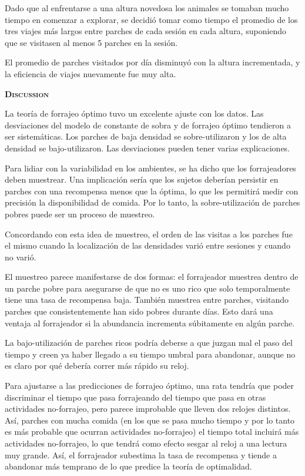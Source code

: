\documentclass[a4paper,12pt]{article}
\begin{document}
Dado que al enfrentarse a una altura novedosa los animales se tomaban mucho tiempo en comenzar a explorar, se decidió tomar como tiempo el promedio de los tres viajes más largos entre parches de cada sesión en cada altura, suponiendo que se visitasen al menos 5 parches en la sesión.

El promedio de parches visitados por día disminuyó con la altura incrementada, y la eficiencia de viajes nuevamente fue muy alta.

{\scshape\bfseries Discussion}

La teoría de forrajeo óptimo tuvo un excelente ajuste con los datos. Las desviaciones del modelo de constante de sobra y de forrajeo óptimo tendieron a ser sistemáticas. Los parches de baja densidad se sobre-utilizaron y los de alta densidad se bajo-utilizaron. Las desviaciones pueden tener varias explicaciones.

Para lidiar con la variabilidad en los ambientes, se ha dicho que los forrajeadores deben muestrear. Una implicación sería que los sujetos deberían persistir en parches con una recompensa menos que la óptima, lo que les permitirá medir con precisión la disponibilidad de comida. Por lo tanto, la sobre-utilización de parches pobres puede ser un proceso de muestreo.

Concordando con esta idea de muestreo, el orden de las visitas a los parches fue el mismo cuando la localización de las densidades varió entre sesiones y cuando no varió.

El muestreo parece manifestarse de dos formas: el forrajeador muestrea dentro de un parche pobre para asegurarse de que no es uno rico que solo temporalmente tiene una tasa de recompensa baja. También muestrea entre parches, visitando parches que consistentemente han sido pobres durante días. Esto dará una ventaja al forrajeador si la abundancia incrementa súbitamente en algún parche.

La bajo-utilización de parches ricos podría deberse a que juzgan mal el paso del tiempo y creen ya haber llegado a su tiempo umbral para abandonar, aunque no es claro por qué debería correr más rápido su reloj.

Para ajustarse a las predicciones de forrajeo óptimo, una rata tendría que poder discriminar el tiempo que pasa forrajeando del tiempo que pasa en otras actividades no-forrajeo, pero parece improbable que lleven dos relojes distintos. Así, parches con mucha comida (en los que se pasa mucho tiempo y por lo tanto es más probable que ocurran actividades no-forrajeo) el tiempo total incluirá más actividades no-forrajeo, lo que tendrá como efecto sesgar al reloj a una lectura muy grande. Así, el forrajeador subestima la tasa de recompensa y tiende a abandonar más temprano de lo que predice la teoría de optimalidad.
\end{document}
